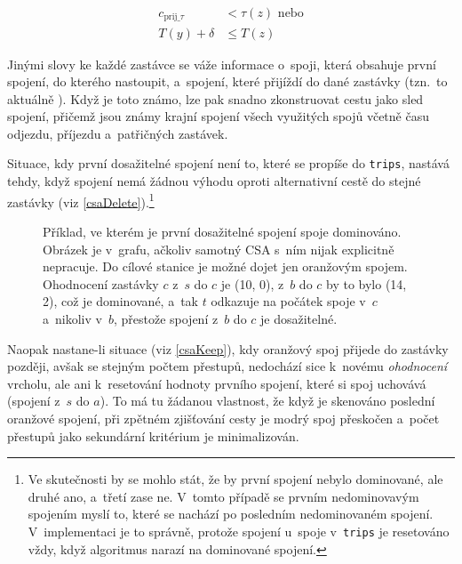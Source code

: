 \begin{align*}
	c_{\text{prij\_}\tau} &< \tau(z) \text{ nebo}\\
	T(y) + \delta &\leq T(z)
\end{align*}

\renewcommand{\subsectionautorefname}{pododdíl}

Jinými slovy ke každé zastávce se váže informace o~spoji, která obsahuje první spojení, do kterého  nastoupit, a~spojení, které přijíždí do dané zastávky (tzn.~to aktuálně ). Když je toto známo, lze pak snadno zkonstruovat cestu jako sled spojení, přičemž jsou známy krajní spojení všech využitých spojů včetně času odjezdu, příjezdu a~patřičných zastávek. 

Situace, kdy první dosažitelné spojení není to, které se propíše do \texttt{trips}, nastává tehdy, když spojení nemá žádnou výhodu oproti alternativní cestě do stejné zastávky (viz \autoref{csaDelete}).\footnote{Ve skutečnosti by se mohlo stát, že by první spojení nebylo dominované, ale druhé ano, a~třetí zase ne. V~tomto případě se prvním nedominovavým spojením myslí to, které se nachází po posledním nedominovaném spojení. V~implementaci je to správně, protože  spojení u~spoje v~\texttt{trips} je resetováno vždy, když algoritmus narazí na dominované spojení.}

\begin{figure}[htbp]
	\centering
	\scalebox{0.8}{\csaDelLabel}
	\caption[Příklad CSA, ve kterém je první dosažitelné spojení spoje dominováno.]{Příklad, ve kterém je první dosažitelné spojení spoje dominováno. Obrázek je v~grafu, ačkoliv samotný CSA s~ním nijak explicitně nepracuje. Do cílové stanice je možné dojet jen \textcolor{RedOrange}{oranžovým} spojem. Ohodnocení zastávky \(c\) z~\(s\) do \(c\) je (10, 0), z~\(b\) do \(c\) by to bylo (14, 2), což je dominované, a~tak \(t\) odkazuje na počátek spoje v~\(c\) a~nikoliv v~\(b\), přestože spojení z~\(b\) do \(c\) je dosažitelné.}
	\label{csaDelete}
\end{figure}

Naopak nastane-li situace (viz \autoref{csaKeep}), kdy oranžový spoj přijede do zastávky později, avšak se stejným počtem přestupů, nedochází sice k~novému \emph{ohodnocení} vrcholu, ale ani k~resetování hodnoty prvního spojení, které si spoj uchovává (spojení z~\(s\) do \(a\)). To má tu žádanou vlastnost, že když je skenováno poslední oranžové spojení, při zpětném zjišťování cesty je modrý spoj přeskočen a~počet přestupů jako sekundární kritérium je minimalizován.


